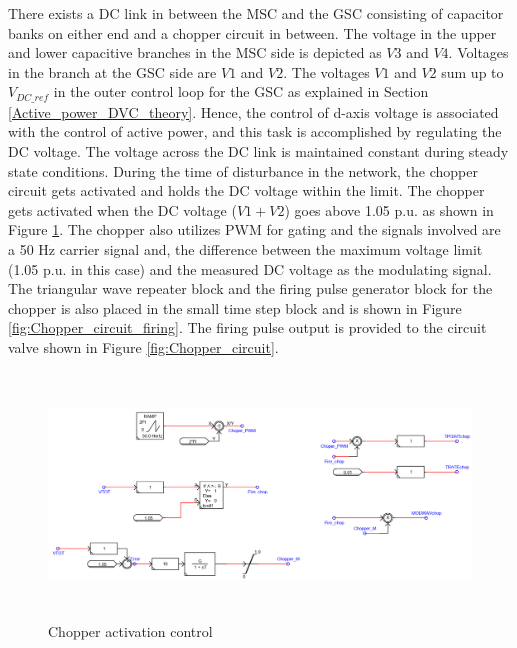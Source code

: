 There exists a \gls{DC} link in between the \gls{MSC} and the \gls{GSC} consisting of capacitor banks on either end and a chopper circuit in between. The voltage in the upper and lower capacitive branches in the \gls{MSC} side is depicted as $V3$ and $V4$. Voltages in the branch at the \gls{GSC} side are $V1$ and $V2$. The voltages $V1$ and $V2$ sum up to $V_{DC\_ref}$ in the outer control loop for the \gls{GSC} as explained in Section \ref{Active_power_DVC_theory}. Hence, the control of d-axis voltage is associated with the control of active power, and this task is accomplished by regulating the \gls{DC} voltage. The voltage across the \gls{DC} link is maintained constant during steady state conditions. During the time of disturbance in the network, the chopper circuit gets activated and holds the \gls{DC} voltage within the limit. The chopper gets activated when the \gls{DC} voltage ($V1 + V2$) goes above 1.05 p.u. as shown in Figure \ref{fig:Chopper_circuit_signals}. The chopper also utilizes \gls{PWM} for gating and the signals involved are a 50 Hz carrier signal and, the difference between the maximum voltage limit (1.05 p.u. in this case) and the measured \gls{DC} voltage as the modulating signal. The triangular wave repeater block and the firing pulse generator block for the chopper is also placed in the small time step block and is shown in Figure \ref{fig:Chopper_circuit_firing}. The firing pulse output is provided to the circuit valve shown in Figure \ref{fig:Chopper_circuit}.

\begin{figure}[H]
\centering
    \includegraphics[height = 6.5cm,width = 16.5cm]{Diagrams/Appendix_A/Chopper_circuit_signals.PNG}
    \caption{Chopper activation control}
    \label{fig:Chopper_circuit_signals}
\end{figure}


